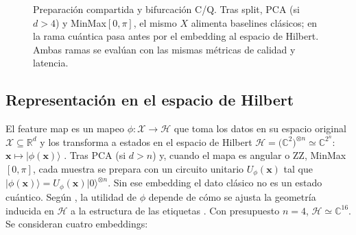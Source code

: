 \begin{figure}[!htbp]
\caption{Preparación compartida y bifurcación C/Q. Tras split, PCA (si $d>4$) y MinMax$[0,\pi]$, el mismo $X$ alimenta baselines clásicos; en la rama cuántica pasa antes por el embedding al espacio de Hilbert. Ambas ramas se evalúan con las mismas métricas de calidad y latencia.}
\label{fig:prep_clasif}
\end{figure}

\subsection{Representación en el espacio de Hilbert}\label{sec:hilbert}

El feature map es un mapeo $\phi\colon\mathcal{X}\to\mathcal{H}$ que toma los datos en su espacio original $\mathcal{X}\subseteq\mathbb{R}^{d}$ y los transforma a estados en el espacio de Hilbert $\mathcal{H}=\bigl(\mathbb{C}^{2}\bigr)^{\otimes n}\simeq\mathbb{C}^{2^{n}}$: $\mathbf{x}\mapsto\lvert\phi(\mathbf{x})\rangle$ \citep{lloyd2020, pennylaneGlossaryEmbedding, schuld2021, parateEncodingGuide}. Tras PCA (si $d>n$) y, cuando el mapa es angular o ZZ, MinMax$[0,\pi]$, cada muestra se prepara con un circuito unitario $U_{\phi}(\mathbf{x})$ tal que $\lvert\phi(\mathbf{x})\rangle=U_{\phi}(\mathbf{x})\lvert 0\rangle^{\otimes n}$. Sin ese embedding el dato clásico no es un estado cuántico. Según \citet{huang2021}, la utilidad de $\phi$ depende de cómo se ajusta la geometría inducida en $\mathcal{H}$ a la estructura de las etiquetas \citep{pennylaneEmbedBlog, parzygnat2025}. Con presupuesto $n=4$, $\mathcal{H}\simeq\mathbb{C}^{16}$. Se consideran cuatro embeddings:

